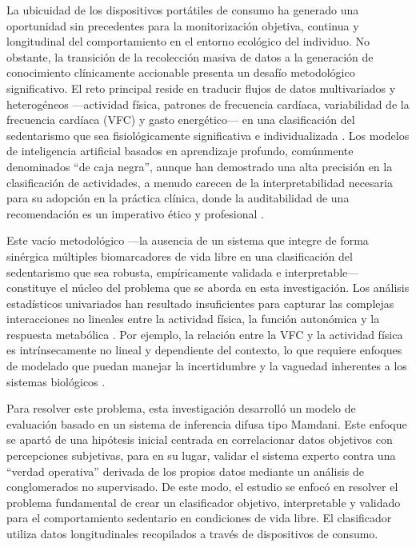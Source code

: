 La ubicuidad de los dispositivos portátiles de consumo ha generado una oportunidad sin precedentes para la monitorización objetiva, continua y longitudinal del comportamiento en el entorno ecológico del individuo. No obstante, la transición de la recolección masiva de datos a la generación de conocimiento clínicamente accionable presenta un desafío metodológico significativo. El reto principal reside en traducir flujos de datos multivariados y heterogéneos ---actividad física, patrones de frecuencia cardíaca, variabilidad de la frecuencia cardíaca (VFC) y gasto energético--- en una clasificación del sedentarismo que sea fisiológicamente significativa e individualizada \citep{Deka2023Nonlinear}. Los modelos de inteligencia artificial basados en aprendizaje profundo, comúnmente denominados ``de caja negra'', aunque han demostrado una alta precisión en la clasificación de actividades, a menudo carecen de la interpretabilidad necesaria para su adopción en la práctica clínica, donde la auditabilidad de una recomendación es un imperativo ético y profesional \citep{Vellido2020Importance}.

Este vacío metodológico ---la ausencia de un sistema que integre de forma sinérgica múltiples biomarcadores de vida libre en una clasificación del sedentarismo que sea robusta, empíricamente validada e interpretable--- constituye el núcleo del problema que se aborda en esta investigación. Los análisis estadísticos univariados han resultado insuficientes para capturar las complejas interacciones no lineales entre la actividad física, la función autonómica y la respuesta metabólica \citep{Aubert2022GlobalMatrix}. Por ejemplo, la relación entre la VFC y la actividad física es intrínsecamente no lineal y dependiente del contexto, lo que requiere enfoques de modelado que puedan manejar la incertidumbre y la vaguedad inherentes a los sistemas biológicos \citep{Deka2023Nonlinear}.

Para resolver este problema, esta investigación desarrolló un modelo de evaluación basado en un sistema de inferencia difusa tipo Mamdani. Este enfoque se apartó de una hipótesis inicial centrada en correlacionar datos objetivos con percepciones subjetivas, para en su lugar, validar el sistema experto contra una ``verdad operativa'' derivada de los propios datos mediante un análisis de conglomerados no supervisado. De este modo, el estudio se enfocó en resolver el problema fundamental de crear un clasificador objetivo, interpretable y validado para el comportamiento sedentario en condiciones de vida libre. El clasificador utiliza datos longitudinales recopilados a través de dispositivos de consumo.

